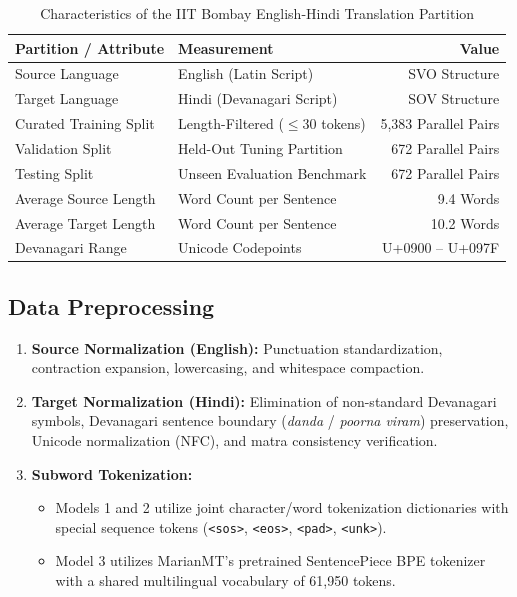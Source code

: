 \begin{table}[H]
\centering
\caption{Characteristics of the IIT Bombay English-Hindi Translation Partition}
\label{tab:exp10_dataset}
\begin{tabular}{llr}
\toprule
\textbf{Partition / Attribute} & \textbf{Measurement} & \textbf{Value} \\
\midrule
Source Language & English (Latin Script) & SVO Structure \\
Target Language & Hindi (Devanagari Script) & SOV Structure \\
Curated Training Split & Length-Filtered ($\le 30$ tokens) & 5,383 Parallel Pairs \\
Validation Split & Held-Out Tuning Partition & 672 Parallel Pairs \\
Testing Split & Unseen Evaluation Benchmark & 672 Parallel Pairs \\
Average Source Length & Word Count per Sentence & 9.4 Words \\
Average Target Length & Word Count per Sentence & 10.2 Words \\
Devanagari Range & Unicode Codepoints & U+0900 -- U+097F \\
\bottomrule
\end{tabular}
\end{table}

\subsection{Data Preprocessing}
\begin{enumerate}
    \item \textbf{Source Normalization (English):} Punctuation standardization, contraction expansion, lowercasing, and whitespace compaction.
    \item \textbf{Target Normalization (Hindi):} Elimination of non-standard Devanagari symbols, Devanagari sentence boundary (\textit{danda} / \textit{poorna viram}) preservation, Unicode normalization (NFC), and matra consistency verification.
    \item \textbf{Subword Tokenization:}
    \begin{itemize}
        \item Models 1 and 2 utilize joint character/word tokenization dictionaries with special sequence tokens (\lstinline|<sos>|, \lstinline|<eos>|, \lstinline|<pad>|, \lstinline|<unk>|).
        \item Model 3 utilizes MarianMT's pretrained SentencePiece BPE tokenizer with a shared multilingual vocabulary of 61,950 tokens.
    \end{itemize}
\end{enumerate}

